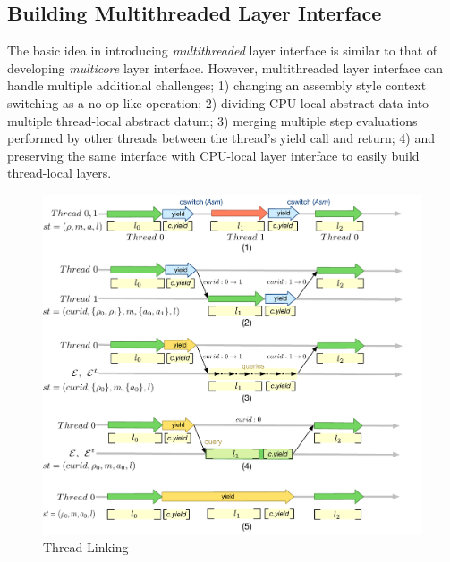 \subsection{Building Multithreaded Layer Interface}\label{subsec:multiplelayersmultilevel}

The basic idea in introducing \emph{multithreaded} layer interface
is similar to that of developing \emph{multicore} layer interface.
However, multithreaded layer interface can handle
multiple additional challenges;
1) changing an assembly style context switching as a no-op like operation;
2) dividing CPU-local abstract data into multiple thread-local abstract datum; 
3) merging multiple step evaluations performed by other threads between the thread's yield call and return; 
4) and preserving the same interface with CPU-local layer interface to easily build thread-local layers.

\begin{figure}
\vspace{-14pt}
\includegraphics[scale=.40]{figs/thread-linking}
\vspace{-5pt}
\caption{Thread Linking}
\label{fig:thread-linking}
\vspace{-5pt}
\end{figure}

